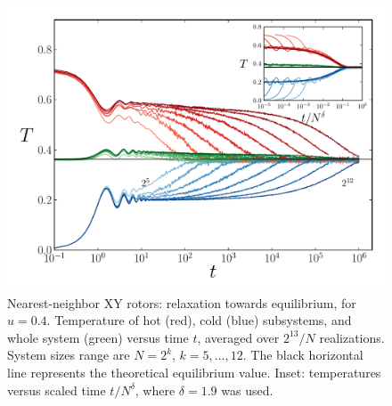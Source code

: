 \documentclass[aps,pre,showpacs,twocolumn,superscriptaddress,floatfix]{revtex4-1}
\begin{document}
\begin{figure}[h!]
\includegraphics[width=1.0\linewidth]{TempLogt_XY__U_0.4__Delta_1.9.pdf}
\caption{Nearest-neighbor XY rotors: relaxation towards equilibrium, for $u=0.4$. 
Temperature of hot (red), cold (blue) subsystems, and whole system (green) 
versus time  $t$,   averaged  over $2^{13}/N$ realizations.  
System sizes range  are $N=2^k$, $k=5, \ldots, 12$.
%
The black horizontal line represents the theoretical equilibrium value. 
Inset:  temperatures versus scaled time $t/N^\delta$, where $\delta=1.9$ was used. 
 }
\label{fig:nn04}
\end{figure}
\end{document}
